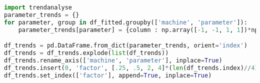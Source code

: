 \begin{lstlisting}[language=python, caption=Befehle zum Ausführen von \texttt{trendanalyse.py}, label=lst:TrendanalyseCommand,frame=single,framerule=0pt]
import trendanalyse
parameter_trends = {}
for parameter, group in df_fitted.groupby(['machine', 'parameter']):
    parameter_trends[parameter] = {column : np.array([-1, -1, 1, 1])*np.array(trendanalyse.trend_of_sequences(group.loc[parameter, 'change'].to_numpy(), group.loc[:,column].to_numpy(), x0=1, sequences=[(.25,1), (.5,1), (1,2), (1,4)])) for column in group.loc[:,'v_offset':'ISE']}

df_trends = pd.DataFrame.from_dict(parameter_trends, orient='index')
df_trends = df_trends.explode(list(df_trends))
df_trends.rename_axis(['machine', 'parameter'], inplace=True)
df_trends.insert(0, 'factor', [.25, .5, 2, 4]*(len(df_trends.index)//4))
df_trends.set_index(['factor'], append=True, inplace=True)
\end{lstlisting}